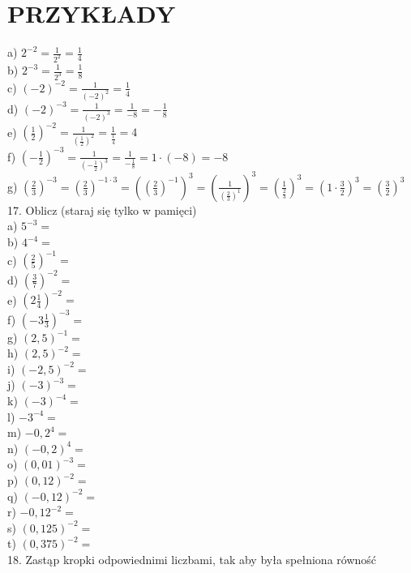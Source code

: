 \documentclass[10pt]{article}
\begin{document}
\section*{PRZYKŁADY}
a) \(2^{-2}=\frac{1}{2^{2}}=\frac{1}{4}\)\\
b) \(2^{-3}=\frac{1}{2^{3}}=\frac{1}{8}\)\\
c) \((-2)^{-2}=\frac{1}{(-2)^{2}}=\frac{1}{4}\)\\
d) \((-2)^{-3}=\frac{1}{(-2)^{3}}=\frac{1}{-8}=-\frac{1}{8}\)\\
e) \(\left(\frac{1}{2}\right)^{-2}=\frac{1}{\left(\frac{1}{2}\right)^{2}}=\frac{1}{\frac{1}{4}}=4\)\\
f) \(\left(-\frac{1}{2}\right)^{-3}=\frac{1}{\left(-\frac{1}{2}\right)^{3}}=\frac{1}{-\frac{1}{8}}=1 \cdot(-8)=-8\)\\
g) \(\left(\frac{2}{3}\right)^{-3}=\left(\frac{2}{3}\right)^{-1 \cdot 3}=\left(\left(\frac{2}{3}\right)^{-1}\right)^{3}=\left(\frac{1}{\left(\frac{2}{3}\right)^{1}}\right)^{3}=\left(\frac{1}{\frac{2}{3}}\right)^{3}=\left(1 \cdot \frac{3}{2}\right)^{3}=\left(\frac{3}{2}\right)^{3}\)\\
17. Oblicz (staraj się tylko w pamięci)\\
a) \(5^{-3}=\)\\
b) \(4^{-4}=\)\\
c) \(\left(\frac{2}{5}\right)^{-1}=\)\\
d) \(\left(\frac{3}{7}\right)^{-2}=\)\\
e) \(\left(2 \frac{1}{4}\right)^{-2}=\)\\
f) \(\left(-3 \frac{1}{3}\right)^{-3}=\)\\
g) \((2,5)^{-1}=\)\\
h) \((2,5)^{-2}=\)\\
i) \((-2,5)^{-2}=\)\\
j) \((-3)^{-3}=\)\\
k) \((-3)^{-4}=\)\\
l) \(-3^{-4}=\)\\
m) \(-0,2^{4}=\)\\
n) \((-0,2)^{4}=\)\\
o) \((0,01)^{-3}=\)\\
p) \((0,12)^{-2}=\)\\
q) \((-0,12)^{-2}=\)\\
r) \(-0,12^{-2}=\)\\
s) \((0,125)^{-2}=\)\\
t) \((0,375)^{-2}=\)\\
18. Zastąp kropki odpowiednimi liczbami, tak aby była spełniona równość\\
\end{document}
